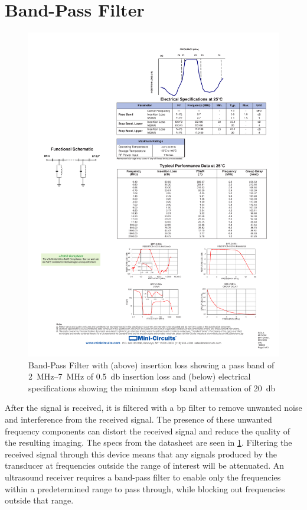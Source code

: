 \section{Band-Pass Filter}
\begin{figure}[htbp]
	\centering
	\includegraphics[width=.8\textwidth]{Figures/3_bpf_specs.pdf}
	\caption[Band-Pass Filter insertion loss and specifications]{Band-Pass Filter with (above) insertion loss showing a pass band of \qtyrange{2}{7}{\mega\hertz} of \qty{0.5}{\decibel} insertion loss and (below) electrical specifications showing the minimum stop band attenuation of \qty{20}{\decibel}}
	\label{fig:3_bpf_specs}
\end{figure}
After the signal is received, it is filtered with a \gls{bp} filter to remove unwanted noise and interference from the received signal. The presence of these unwanted frequency components can distort the received signal and reduce the quality of the resulting imaging. The specs from the datasheet \cite{BPF} are seen in \cref{fig:3_bpf_specs}. Filtering the received signal through this device means that any signals produced by the transducer at frequencies outside the range of interest will be attenuated. An ultrasound receiver requires a band-pass filter to enable only the frequencies within a predetermined range to pass through, while blocking out frequencies outside that range.

